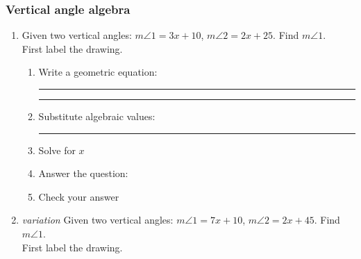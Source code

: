 \documentclass[12pt, oneside]{article}
\begin{document}
\subsubsection*{Vertical angle algebra}
  \begin{enumerate}
    \item Given two vertical angles: $m \angle 1 = 3x+10$, $m \angle 2 = 2x+25$. Find $m \angle 1$.\\
    First label the drawing.
    \begin{flushright}
    \end{flushright}
    \begin{enumerate}
      \item Write a geometric equation: \rule{4cm}{0.15mm} \hspace{1cm} \rule{4cm}{0.15mm}
      \item Substitute algebraic values: \rule{4cm}{0.15mm}
      \item Solve for $x$
      \item Answer the question:
      \item Check your answer
      \end{enumerate}

  \item \emph{variation} Given two vertical angles: $m \angle 1 = 7x+10$, $m \angle 2 = 2x+45$. Find $m \angle 1$.\\
    First label the drawing.
    \begin{flushright}
    \end{flushright}


\end{enumerate}
\end{document}
